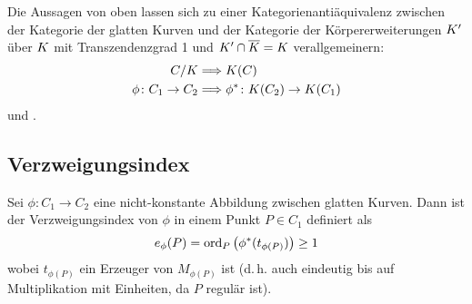 \begin{Satz}[Kategorienäquivalenz]\label{kategorienaequivalenz}
  Die Aussagen von oben lassen sich zu einer Kategorienantiäquivalenz
  zwischen der Kategorie der glatten Kurven und der Kategorie der
  Körpererweiterungen $K'$ über $K$ mit Transzendenzgrad 1 und
  $K'\cap\overline K=K$ verallgemeinern:
  \begin{align*}
    C/K &\Longrightarrow K(C)\\
    \phi\colon C_1\to C_2 &\Longrightarrow \phi^*\colon K(C_2)\to K(C_1)
  \end{align*}
  \cite[siehe][Corollary I.6.11]{hartshorne} und
  \cite[siehe][Remark II.2.5]{silverman}.
\end{Satz}


\subsection{Verzweigungsindex}
\begin{Definition}[Verzweigungsindex]\label{verzweigungsindex}
  Sei $\phi\colon C_1\to C_2$ eine nicht-konstante Abbildung zwischen
  glatten Kurven.
  Dann ist der Verzweigungsindex von $\phi$ in einem Punkt
  $P\in C_1$ definiert als
  \begin{gather*}
    e_\phi(P) = \operatorname{ord}_P \left( \phi^*(t_{\phi(P)}) \right) \geq 1
  \end{gather*}
  wobei $t_{\phi(P)}$ ein Erzeuger von $M_{\phi(P)}$ ist (d.\,h. auch
  eindeutig bis auf Multiplikation mit Einheiten, da $P$ regulär ist).
\end{Definition}

